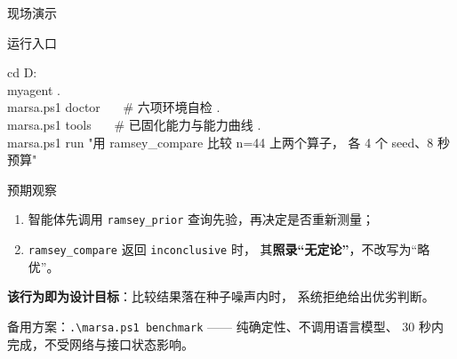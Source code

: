 \documentclass[aspectratio=169,11pt]{beamer}
\newcommand{\code}[1]{\texttt{\small #1}}
\begin{document}
\begin{frame}[fragile]{现场演示}
  \begin{block}{运行入口}
    \begin{semiverbatim}
\small
cd D:\\myagent
.\\marsa.ps1 doctor     \ \ \ \# 六项环境自检
.\\marsa.ps1 tools      \ \ \ \# 已固化能力与能力曲线
.\\marsa.ps1 run "用 ramsey_compare 比较 n=44 上两个算子，
                 各 4 个 seed、8 秒预算"
    \end{semiverbatim}
  \end{block}

  \vspace{0.3em}
  \begin{block}{预期观察}
    \footnotesize
    \begin{enumerate}
      \item 智能体先调用 \code{ramsey\_prior} 查询先验，再决定是否重新测量；
      \item \code{ramsey\_compare} 返回 \code{inconclusive} 时，
        其\textbf{照录“无定论”}，不改写为“略优”。
    \end{enumerate}
    \vspace{0.3em}
    \textbf{该行为即为设计目标}：比较结果落在种子噪声内时，
    系统拒绝给出优劣判断。
  \end{block}

  \vspace{0.3em}
  \footnotesize\color{black!70}
  备用方案：\code{.\textbackslash marsa.ps1 benchmark} —— 纯确定性、不调用语言模型、
  30 秒内完成，不受网络与接口状态影响。
\end{frame}
\end{document}
